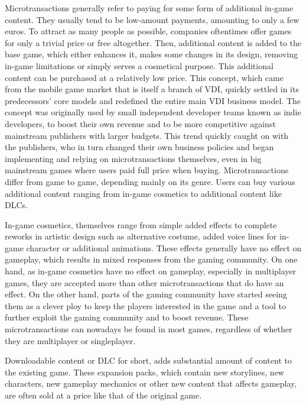 \documentclass[10pt,british,a4paper,titlepage]{article}
\begin{document}
Microtransactions generally refer to paying for some form of additional in-game content. They usually tend to be low-amount payments, amounting to only a few euros. To attract as many people as possible, companies oftentimes offer games for only a trivial price or free altogether. Then, additional content is added to the base game, which either enhances it, makes some changes in its design, removing in-game limitations or simply serves a cosmetical purpose. This additional content can be purchased at a relatively low price. This concept, which came from the mobile game market that is itself a branch of VDI, quickly settled in its predecessors’ core models and redefined the entire main VDI business model. The concept was originally used by small independent developer teams known as indie developers, to boost their own revenue and to be more competitive against mainstream publishers with larger budgets. This trend quickly caught on with the publishers, who in turn changed their own business policies and began implementing and relying on microtransactions themselves, even in big mainstream games where users paid full price when buying. Microtransactions differ from game to game, depending mainly on its genre. Users can buy various additional content ranging from in-game cosmetics to additional content like DLCs. 

In-game cosmetics, themselves range from simple added effects to complete reworks in artistic design such as alternative costume, added voice lines for in-game character or additional animations. These effects generally have no effect on gameplay, which results in mixed responses from the gaming community. On one hand, as in-game cosmetics have no effect on gameplay, especially in multiplayer games, they are accepted more than other microtransactions that do have an effect. On the other hand, parts of the gaming community have started seeing them as a clever ploy to keep the players interested in the game and  a tool to further exploit the gaming community and to boost revenue. These microtransactions can nowadays be found in most games, regardless of whether they are multiplayer or singleplayer. 

Downloadable content or DLC for short, adds substantial amount of content to the existing game. These expansion packs, which contain new storylines, new characters, new gameplay mechanics or other new content that affects gameplay, are often sold at a price like that of the original game. 
\end{document}
